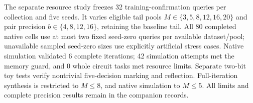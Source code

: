 The separate resource study freezes 32 training-confirmation queries per collection and five seeds. It varies eligible tail pools \(M\in\{3,5,8,12,16,20\}\) and pair precision \(b\in\{4,8,12,16\}\), retaining the baseline tail. All 80 completed native cells use at most two fixed seed-zero queries per available dataset/pool; unavailable sampled seed-zero sizes use explicitly artificial stress cases. Native simulation validated 6 complete iterations; 42 simulation attempts met the memory guard, and 0 whole circuit tasks met resource limits. Separate two-bit toy tests verify nontrivial five-decision marking and reflection. Full-iteration synthesis is restricted to \(M\leq8\), and native simulation to \(M\leq5\). All limits and complete precision results remain in the companion records.

